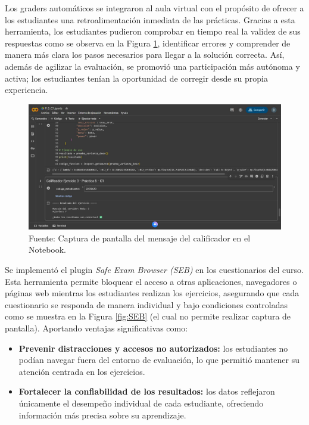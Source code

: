 \documentclass[letter,oneside,12pt,spanish]{report}
\begin{document}
Los graders automáticos se integraron al aula virtual con el propósito de ofrecer a los estudiantes una retroalimentación inmediata de las prácticas. Gracias a esta herramienta, los estudiantes pudieron comprobar en tiempo real la validez de sus respuestas como se observa en la Figura \ref{fig:Colab}, identificar errores y comprender de manera más clara los pasos necesarios para llegar a la solución correcta. Así, además de agilizar la evaluación, se promovió una participación más autónoma y activa; los estudiantes tenían la oportunidad de corregir desde su propia experiencia.

\begin{figure}[ht]
	\centering
	\includegraphics[width=1\textwidth]{Figs/Colab.pdf}
	\label{fig:Colab}
	\\Fuente: Captura de pantalla del mensaje del calificador en el Notebook.
\end{figure}
\newpage
Se implementó el plugin \textit{Safe Exam Browser (SEB)} en los cuestionarios del curso. Esta herramienta permite bloquear el acceso a otras aplicaciones, navegadores o páginas web mientras los estudiantes realizan los ejercicios, asegurando que cada cuestionario se responda de manera individual y bajo condiciones controladas como se muestra en la Figura \ref{fig:SEB} (el cual no permite realizar captura de pantalla). Aportando ventajas significativas como:

\begin{itemize}
    \item \textbf{Prevenir distracciones y accesos no autorizados:} los estudiantes no podían navegar fuera del entorno de evaluación, lo que permitió mantener su atención centrada en los ejercicios.
    \item \textbf{Fortalecer la confiabilidad de los resultados:} los datos reflejaron únicamente el desempeño individual de cada estudiante, ofreciendo información más precisa sobre su aprendizaje.
\end{itemize}
\end{document}
